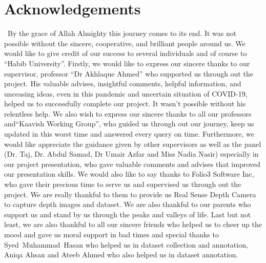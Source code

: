 \documentclass[12pt,twosided]{report}
\begin{document}
\chapter*{Acknowledgements}
\
By the grace of Allah Almighty this journey comes to its end. It was not possible without the sincere, cooperative, and brilliant people around us. We would like to give credit of our success to several individuals and of course to ``Habib University''. Firstly, we would like to express our sincere thanks to our supervisor, professor ``Dr Akhlaque Ahmed'' who supported us through out the project. His valuable advises, insightful comments, helpful information, and unceasing ideas, even in this pandemic and uncertain situation of COVID-19, helped us to successfully complete our project. It wasn't possible without his relentless help.  \newline
We also wish to express our sincere thanks to all our professors  and``Kaavish Working Group'', who guided us through out our journey, keep us updated in this worst time and answered every query on time. Furthermore, we would like appreciate the guidance given by other supervisors as well as the panel (Dr. Taj, Dr. Abdul Samad, Dr Umair Azfar and Miss Nadia Nasir) especially in our project presentation, who gave valuable comments and advises that improved our presentation skills. \newline
We would also like to say thanks to Folio3 Software Inc, who gave their precious time to serve us and supervised us through out the project. We are really thankful to them to provide us Real Sense Depth Camera to capture depth images and dataset. \newline
We are also thankful to our parents who support us and stand by us through the peaks and valleys of life. \newline
Last but not least, we are also thankful to all our sincere friends who helped us to cheer up the mood and gave us moral support in bad times and special thanks to Syed Muhammad Hasan who helped us in dataset collection and annotation, Aniqa Ahsan and Ateeb Ahmed who also helped us in dataset annotation. 
\end{document}
